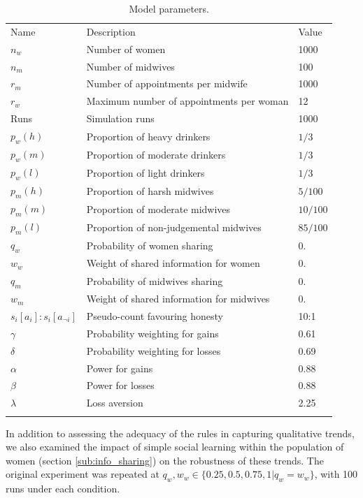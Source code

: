 \documentclass[graybox]{svmult}
\begin{document}
\begin{table}[h!]
\caption{Model parameters.} 
\label{tab:qt_params}
\begin{tabular} {lll}
\hline\noalign{\smallskip}
Name & Description & Value \\
\noalign{\smallskip}\svhline\noalign{\smallskip}
\(n_{w}\) & Number of women & 1000 \\ 
\(n_{m}\) & Number of midwives & 100 \\ 
\(r_{m}\) & Number of appointments per midwife & 1000 \\ 
\(r_{w}\) & Maximum number of appointments per woman & 12 \\ 
Runs & Simulation runs & 1000 \\ 
\(p_{w}(h)\) & Proportion of heavy drinkers & \(1/3\) \\ 
\(p_{w}(m)\) & Proportion of moderate drinkers & \(1/3\) \\ 
\(p_{w}(l)\) & Proportion of light drinkers & \(1/3\) \\ 
\(p_{m}(h)\) & Proportion of harsh midwives & \(5/100\) \\ 
\(p_{m}(m)\) & Proportion of moderate midwives & \(10/100\) \\ 
\(p_{m}(l)\) & Proportion of non-judgemental midwives & \(85/100\) \\ 
\(q_{w}\) & Probability of women sharing & 0. \\ 
\(w_{w}\) & Weight of shared information for women & 0. \\ 
\(q_{m}\) & Probability of midwives sharing & 0. \\ 
\(w_{m}\) & Weight of shared information for midwives & 0. \\ 
\(s_{i}[a_{i}]:s_{i}[a_{\neg i}]\) & Pseudo-count favouring honesty & 10:1 \\ 
\(\gamma\) & Probability weighting for gains  & 0.61 \\ 
\(\delta\) & Probability weighting for losses &  0.69\\ 
\(\alpha\) & Power for gains  & 0.88 \\ 
\(\beta\) & Power for losses & 0.88 \\ 
\(\lambda\) & Loss aversion &  2.25 \\
\noalign{\smallskip}\hline\noalign{\smallskip}
\end{tabular}
\end{table}


In addition to assessing the adequacy of the rules in capturing qualitative trends, we also examined the impact of simple social learning within the population of women (section \ref{sub:info_sharing}) on the robustness of these trends. The original experiment was repeated at \(q_{w},w_{w}\in \{0.25, 0.5, 0.75, 1 | q_{w}=w_{w}\}\), with 100 runs under each condition. 
\end{document}
